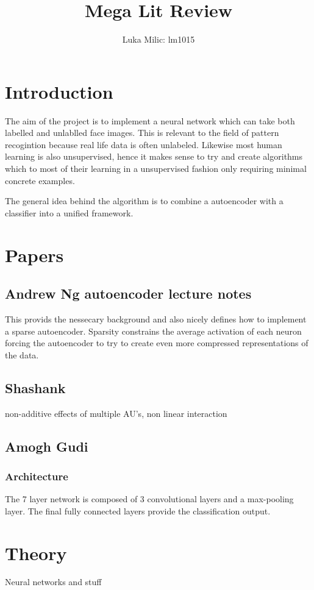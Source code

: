 \documentclass[11pt]{article}
\title{Mega Lit Review}
\author{Luka Milic: lm1015}
\begin{document}
\maketitle
\section{Introduction}
The aim of the project is to implement a neural network which can take both
labelled and unlablled face images. \cite{tensorflow2015-whitepaper}
This is relevant to the field of pattern recogintion because real life data is often unlabeled.
Likewise most human learning is also unsupervised, hence it makes sense to try and create algorithms which
to most of their learning in a unsupervised fashion only requiring minimal concrete examples.

The general idea behind the algorithm is to combine a autoencoder with a classifier into a unified
framework.
\section{Papers}
\subsection{Andrew Ng autoencoder lecture notes}
This provids the nessecary background and also nicely defines
how to implement a sparse autoencoder. Sparsity constrains the average
activation of each neuron forcing the autoencoder to try to create even more
compressed representations of the data.
\subsection{Shashank}
non-additive effects of multiple AU's, non linear interaction
\subsection{Amogh Gudi}
\subsubsection{Architecture}
The 7 layer network is composed of 3 convolutional
layers and a max-pooling layer. The final fully connected layers
provide the classification output.
\section{Theory}
Neural networks and stuff\cite{jaiswal_deep_2016}
\end{document}
